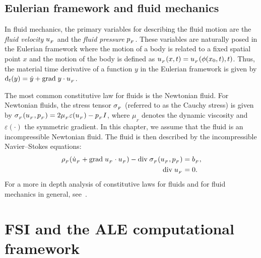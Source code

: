 \subsection{Eulerian framework and fluid mechanics}
\label{selim:sec:fluid}

In fluid mechanics, the primary variables for describing the fluid
motion are the \emph{fluid velocity} $u_{_{F}}$ and the \emph{fluid pressure}
$p_{_{F}}$. These variables are naturally posed in the Eulerian framework
where the motion of a body is related to a fixed spatial point $x$ and the
motion of the body is defined as $u_{_{F}}(x,t) = u_{_{F}}(\phi(x_0,t),t)$. Thus,
the material time derivative of a function $y$ in the Eulerian framework
is given by $\textrm{d}_t(y) = \dot{y} + \textrm{grad}\;y\cdot u_{_{F}}$.

The most common constitutive law for fluids is the Newtonian fluid.
For Newtonian fluids, the stress tensor $\sigma_{_{F}}$ (referred to as the
Cauchy stress) is given by $\sigma_{_{F}}(u_{_{F}}, p_{_{F}}) = 2\mu_{_{F}}\varepsilon (u_{_{F}}) -
p_{_{F}} I$, where $\mu_{_{F}}$ denotes the dynamic viscosity and
$\varepsilon(\cdot)$ the symmetric gradient. In this chapter, we
assume that the fluid is an incompressible Newtonian fluid. The fluid
is then described by the incompressible Navier--Stokes
equations:
\begin{align}
  \label{selim:eq:NSmom}
      \rho_{_{F}}(\dot{u}_{_{F}} + \textrm{grad}\;u_{_{F}}\cdot u_{_{F}})- \textrm{div}\;
      \sigma_{_{F}}(u_{_{F}}, p_{_{F}}) &= b_{_{F}},
\\
  \label{selim:eq:NScon}
      \textrm{div}\; u_{_{F}} &= 0.
\end{align}
For a more in depth analysis of constitutive laws
for fluids and for fluid mechanics in general,
see~\citet{Batchelor1967,Panton1984}.
\section{FSI and the ALE computational framework}
\label{selim:sec:ale}

